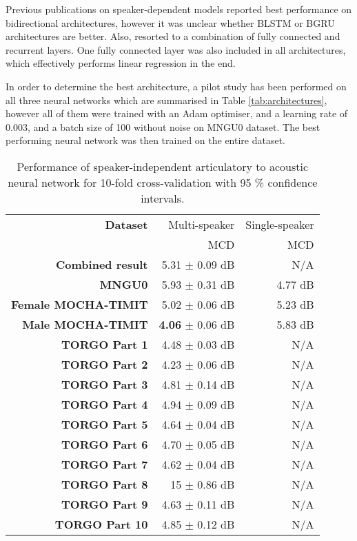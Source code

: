 \documentclass[a4paper]{article}
\begin{document}
Previous publications on speaker-dependent models reported best
performance on bidirectional architectures, however it was unclear whether
BLSTM or BGRU architectures are better. Also, \cite{Taguchi} resorted to
a combination of fully connected and recurrent layers. One fully connected layer
was also included in all architectures, which effectively performs linear
regression in the end.

In order to determine the best architecture, a pilot study has been
performed on all three neural networks which are summarised in Table \ref{tab:architectures},
however all of them were trained with an Adam optimiser, and a learning rate
of \( 0.003 \), and a batch size of 100 without noise on MNGU0 dataset.
The best performing neural network was then trained on the entire dataset. 


\begin{table}[th]
  \caption{Performance of speaker-independent articulatory to acoustic neural network for 10-fold cross-validation with 95 \% confidence intervals.}
  \label{tab:all_data}
  \centering
  \footnotesize

  \begin{tabular}{ r r r }
    \toprule
    \textbf{Dataset} & Multi-speaker & Single-speaker \\
    & MCD & MCD \\
    \midrule 
    \textbf{Combined result} & 5.31 $\pm$ 0.09 dB & N/A \\  
    \midrule
    \textbf{MNGU0} & 5.93 $\pm$ 0.31 dB & 4.77 dB \\
    \textbf{Female MOCHA-TIMIT} & 5.02 $\pm$ 0.06 dB  & 5.23 dB \\
    \textbf{Male MOCHA-TIMIT} & \textbf{4.06} $\pm$ 0.06 dB & 5.83 dB \\
    \textbf{TORGO Part 1} & 4.48 $\pm$ 0.03 dB & N/A \\
    \textbf{TORGO Part 2} & 4.23 $\pm$ 0.06 dB & N/A \\
    \textbf{TORGO Part 3} & 4.81 $\pm$ 0.14 dB & N/A \\
    \textbf{TORGO Part 4} & 4.94 $\pm$ 0.09 dB & N/A \\
    \textbf{TORGO Part 5} & 4.64 $\pm$ 0.04 dB & N/A \\
    \textbf{TORGO Part 6} & 4.70 $\pm$ 0.05 dB & N/A \\
    \textbf{TORGO Part 7} & 4.62 $\pm$ 0.04 dB & N/A \\
    \textbf{TORGO Part 8} & 15 $\pm$ 0.86 dB & N/A\\
    \textbf{TORGO Part 9} & 4.63 $\pm$ 0.11 dB & N/A \\
    \textbf{TORGO Part 10} & 4.85 $\pm$ 0.12 dB & N/A \\
    \bottomrule
  \end{tabular}
\end{table}
\end{document}
